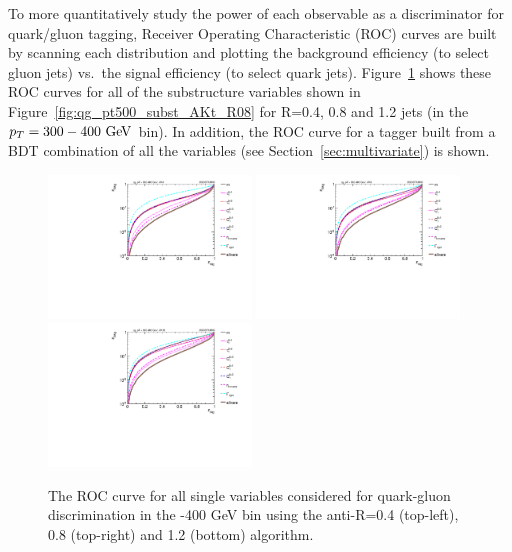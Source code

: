 To more quantitatively study the power of each observable as a
discriminator for quark/gluon tagging, Receiver Operating Characteristic (ROC) curves are built by scanning each distribution
and plotting the background efficiency (to select gluon jets) vs.~the signal efficiency (to select quark jets). 
Figure~\ref{fig:qg_pt300_single} shows these ROC curves for all of the
substructure variables shown in 
Figure~\ref{fig:qg_pt500_subst_AKt_R08} for R=0.4, 0.8 and 1.2 jets (in the $\pt=300-400\GeV$
bin). In addition, the ROC curve for a tagger built from a BDT
combination of all the variables (see Section~\ref{sec:multivariate}) is shown.
%
\begin{figure}
\centering
\includegraphics[width=0.48\textwidth]{./Figures/QGTagging/pT300/AKtR04/Rocs_1D_single.pdf}
\includegraphics[width=0.48\textwidth]{./Figures/QGTagging/pT300/AKtR08/Rocs_1D_single.pdf}
\includegraphics[width=0.48\textwidth]{./Figures/QGTagging/pT300/AKtR12/Rocs_1D_single.pdf}
\caption{The ROC curve for all single variables considered for
  quark-gluon discrimination in the -400 GeV bin using the
  anti-\kT R=0.4 (top-left), 0.8 (top-right) and 1.2 (bottom) algorithm.%
}
\label{fig:qg_pt300_single}
\end{figure}
